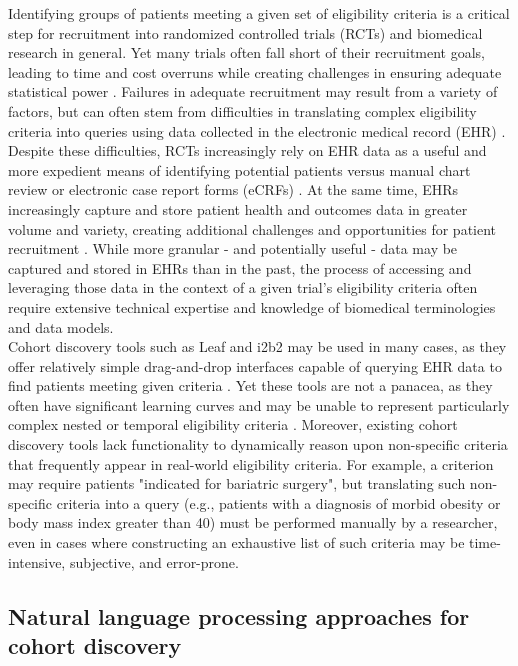 \documentclass[../main.tex]{subfiles}
\begin{document}
\noindent Identifying groups of patients meeting a given set of eligibility criteria is a critical step for recruitment into randomized controlled trials (RCTs) and biomedical research in general. Yet many trials often fall short of their recruitment goals, leading to time and cost overruns while creating challenges in ensuring adequate statistical power \cite{gul2010clinical, adams2015barriers}. Failures in adequate recruitment may result from a variety of factors, but can often stem from difficulties in translating complex eligibility criteria into queries using data collected in the electronic medical record (EHR) \cite{wang2017classifying}. Despite these difficulties, RCTs increasingly rely on EHR data as a useful and more expedient means of identifying potential patients versus manual chart review or electronic case report forms (eCRFs) \cite{cowie2017electronic}. At the same time, EHRs increasingly capture and store patient health and outcomes data in greater volume and variety, creating additional challenges and opportunities for patient recruitment \cite{lee2017medical}. While more granular - and potentially useful - data may be captured and stored in EHRs than in the past, the process of accessing and leveraging those data in the context of a given trial's eligibility criteria often require extensive technical expertise and knowledge of biomedical terminologies and data models. \\

\noindent Cohort discovery tools such as Leaf \cite{dobbins2019leaf} and i2b2 \cite{murphy2010serving} may be used in many cases, as they offer relatively simple drag-and-drop interfaces capable of querying EHR data to find patients meeting given criteria \cite{johnson2014use}. Yet these tools are not a panacea, as they often have significant learning curves and may be unable to represent particularly complex nested or temporal eligibility criteria \cite{deshmukh2009evaluating}. Moreover, existing cohort discovery tools lack functionality to dynamically reason upon non-specific criteria that frequently appear in real-world eligibility criteria. For example, a criterion may require patients "indicated for bariatric surgery", but translating such non-specific criteria into a query (e.g., patients with a diagnosis of morbid obesity or body mass index greater than 40) must be performed manually by a researcher, even in cases where constructing an exhaustive list of such criteria may be time-intensive, subjective, and error-prone.

\subsection*{Natural language processing approaches for cohort discovery}
\end{document}
